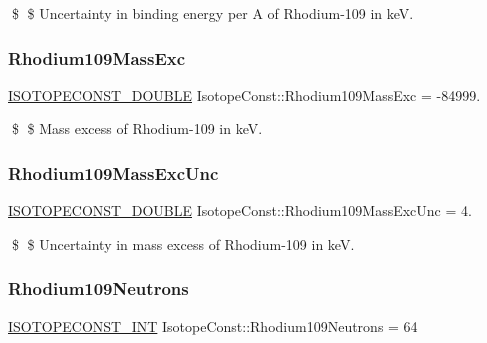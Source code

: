 \$ \$ Uncertainty in binding energy per A of Rhodium-\/109 in keV. \mbox{\label{group___isotope_const-_rhodium-_rh109_ga9cf036c81fd0782e089faf2926787de5}} 
\subsubsection{\texorpdfstring{Rhodium109\+Mass\+Exc}{Rhodium109MassExc}}
{\footnotesize\ttfamily \mbox{\hyperlink{group___isotope_const-_macros_ga8f45a7272ce02c0b4c65c44636ed719a}{I\+S\+O\+T\+O\+P\+E\+C\+O\+N\+S\+T\+\_\+\+D\+O\+U\+B\+LE}} Isotope\+Const\+::\+Rhodium109\+Mass\+Exc = -\/84999.}

\$ \$ Mass excess of Rhodium-\/109 in keV. \mbox{\label{group___isotope_const-_rhodium-_rh109_ga7ae01bda2aa3d79cd370364b954b3e9a}} 
\subsubsection{\texorpdfstring{Rhodium109\+Mass\+Exc\+Unc}{Rhodium109MassExcUnc}}
{\footnotesize\ttfamily \mbox{\hyperlink{group___isotope_const-_macros_ga8f45a7272ce02c0b4c65c44636ed719a}{I\+S\+O\+T\+O\+P\+E\+C\+O\+N\+S\+T\+\_\+\+D\+O\+U\+B\+LE}} Isotope\+Const\+::\+Rhodium109\+Mass\+Exc\+Unc = 4.}

\$ \$ Uncertainty in mass excess of Rhodium-\/109 in keV. \mbox{\label{group___isotope_const-_rhodium-_rh109_ga8376f251387339ef41d68dfb3d6b2e37}} 
\subsubsection{\texorpdfstring{Rhodium109\+Neutrons}{Rhodium109Neutrons}}
{\footnotesize\ttfamily \mbox{\hyperlink{group___isotope_const-_macros_ga5f18360b3e99483a35c32d789e62621c}{I\+S\+O\+T\+O\+P\+E\+C\+O\+N\+S\+T\+\_\+\+I\+NT}} Isotope\+Const\+::\+Rhodium109\+Neutrons = 64}

